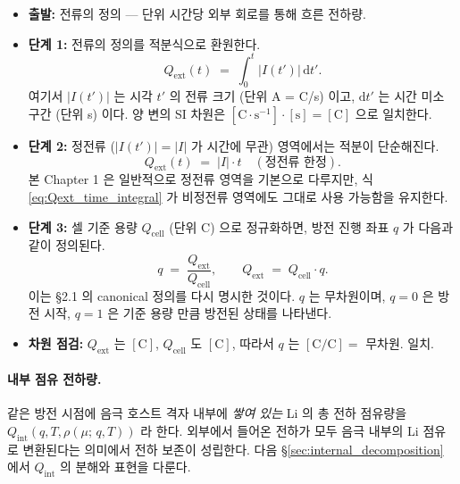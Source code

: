 \documentclass[11pt,a4paper]{article}
\newcommand{\dd}{\mathrm{d}}
\newcommand{\cell}{\mathrm{cell}}
\newcommand{\ext}{\mathrm{ext}}
\newcommand{\Cunit}{\mathrm{C}}
\newcommand{\mucont}{\mu}
\newcommand{\rhomu}{\rho(\mucont;\, q, T)}
\begin{document}
\begin{itemize}
\item \textbf{출발:} 전류의 정의 — 단위 시간당 외부 회로를 통해 흐른 전하량.
\item \textbf{단계 1:} 전류의 정의를 적분식으로 환원한다.
      \begin{equation}
      Q_{\ext}(t) \;=\; \int_{0}^{t} |I(t')|\, \dd t'.
      \label{eq:Qext_time_integral}
      \end{equation}
      여기서 $|I(t')|$ 는 시각 $t'$ 의 전류 크기 (단위 A = C/s) 이고, $\dd t'$ 는
      시간 미소 구간 (단위 s) 이다. 양 변의 SI 차원은 $[\Cunit\cdot\mathrm{s}^{-1}]
      \cdot[\mathrm{s}] = [\Cunit]$ 으로 일치한다.
\item \textbf{단계 2:} 정전류 ($|I(t')| = |I|$ 가 시간에 무관) 영역에서는
      적분이 단순해진다.
      \begin{equation}
      Q_{\ext}(t) \;=\; |I| \cdot t \quad (\text{정전류 한정}).
      \label{eq:Qext_constant_I}
      \end{equation}
      본 Chapter 1 은 일반적으로 정전류 영역을 기본으로 다루지만, 식
      \eqref{eq:Qext_time_integral} 가 비정전류 영역에도 그대로 사용 가능함을
      유지한다.
\item \textbf{단계 3:} 셀 기준 용량 $Q_{\cell}$ (단위 $\Cunit$) 으로 정규화하면,
      방전 진행 좌표 $q$ 가 다음과 같이 정의된다.
      \begin{equation}
      q \;=\; \frac{Q_{\ext}}{Q_{\cell}}, \qquad
      Q_{\ext} \;=\; Q_{\cell} \cdot q.
      \label{eq:q_definition_recall}
      \end{equation}
      이는 \S 2.1 의 canonical 정의를 다시 명시한 것이다. $q$ 는 무차원이며,
      $q=0$ 은 방전 시작, $q=1$ 은 기준 용량 만큼 방전된 상태를 나타낸다.
\item \textbf{차원 점검:} $Q_{\ext}$ 는 $[\Cunit]$, $Q_{\cell}$ 도 $[\Cunit]$,
      따라서 $q$ 는 $[\Cunit / \Cunit] = $ 무차원. 일치.
\end{itemize}

\paragraph{내부 점유 전하량.}

같은 방전 시점에 음극 호스트 격자 내부에 \emph{쌓여 있는} Li 의 총 전하 점유량을
$Q_{\mathrm{int}}(q, T, \rhomu)$ 라 한다. 외부에서 들어온 전하가 모두 음극 내부의
Li 점유로 변환된다는 의미에서 전하 보존이 성립한다. 다음 \S\ref{sec:internal_decomposition}
에서 $Q_{\mathrm{int}}$ 의 분해와 표현을 다룬다.
\end{document}
